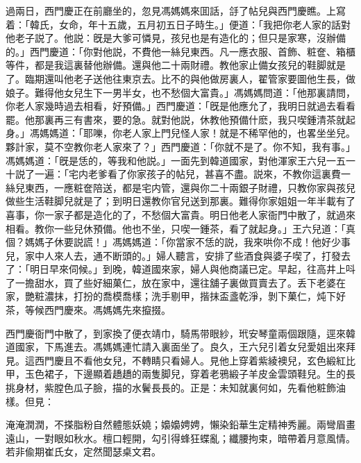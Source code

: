 過兩日，西門慶正在前廳坐的，忽見馮媽媽來囬話，㧱了帖兒與西門慶瞧。上寫着：「韓氏，女命，年十五歲，五月初五日子時生。」便道：「我把你老人家的話對他老子説了。他説：旣是大爹可憐見，孩兒也是有造化的；但只是家寒，沒辦備的。」西門慶道：「你對他説，不費他一絲兒東西。凡一應衣服、首飾、粧奩、箱櫃等件，都是我這裏替他辦備。還與他二十兩財禮。教他家止備女孩兒的鞋脚就是了。臨期還叫他老子送他往東京去。比不的與他做房裏人，翟管家要圖他生長，做娘子。難得他女兒生下一男半女，也不愁個大富貴。」馮媽媽問道：「他那裏請問，你老人家幾時過去相看，好預備。」西門慶道：「旣是他應允了，我明日就過去看看罷。他那裏再三有書來，要的急。就對他説，休教他預備什麽，我只喫鍾清茶就起身。」馮媽媽道：「耶嚛，你老人家上門兒怪人家！就是不稀罕他的，也畧坐坐兒。夥計家，莫不空教你老人家來了？」西門慶道：「你就不是了。你不知，我有事。」馮媽媽道：「旣是恁的，等我和他説。」一面先到韓道國家，對他渾家王六兒一五一十説了一遍：「宅内老爹看了你家孩子的帖兒，甚喜不盡。説來，不教你這裏費一絲兒東西，一應粧奩陪送，都是宅内管，還與你二十兩銀子財禮，只教你家與孩兒做些生活鞋脚兒就是了；到明日還教你官兒送到那裏。難得你家姐姐一年半載有了喜事，你一家子都是造化的了，不愁個大富貴。明日他老人家衙門中散了，就過來相看。教你一些兒休預備。他也不坐，只喫一鍾茶，看了就起身。」王六兒道：「真個？媽媽子休要説謊！」馮媽媽道：「你當家不恁的説，我來哄你不成！他好少事兒，家中人來人去，通不断頭的。」婦人聽言，安排了些酒食與婆子喫了，打發去了：「明日早來伺候。」到晚，韓道國來家，婦人與他商議已定。早起，往高井上呌了一擔甜水，買了些好細菓仁，放在家中，還往舖子裏做買賣去了。丢下老婆在家，艷粧濃抹，打扮的喬模喬樣；洗手剔甲，揩抹盃盞乾淨，剝下菓仁，炖下好茶，等候西門慶來。馮媽媽先來攛掇。

西門慶衙門中散了，到家換了便衣靖巾，騎馬带眼紗，玳安琴童兩個跟隨，逕來韓道國家，下馬進去。馮媽媽連忙請入裏面坐了。良久，王六兒引着女兒愛姐出來拜見。這西門慶且不看他女兒，不轉睛只看婦人。見他上穿着紫綾襖兒，玄色緞紅比甲，玉色裙子，下邊顯着趫趫的兩隻脚兒，穿着老鴉緞子羊皮金雲頭鞋兒。生的長挑身材，紫膛色瓜子臉，描的水鬢長長的。正是：未知就裏何如，先看他粧飾油樣。但見：

淹淹潤潤，不搽脂粉自然體態妖嬈；嬝嬝娉娉，懶染鉛華生定精神秀麗。兩彎眉畫遠山，一對眼如秋水。檀口輕開，勾引得蜂狂蝶亂；纖腰拘束，暗帶着月意風情。若非偸期崔氏女，定然聞瑟桌文君。

